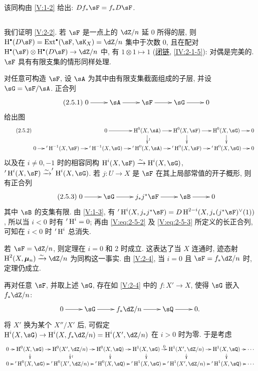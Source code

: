 该同构由 \ref{V:1-2} 给出: $D f_\ast\sF=f_\ast D\sF$.

\subsection{}\label{V:2-5}

我们证明 \ref{V:2-2}. 若 $\sF$ 是一点上的 $\dZ/n$ 延 $0$ 所得的层,
则 $\h^\bullet(D\sF) = \ext^\bullet(\sF,\sK_X)=\dZ/n$ 集中于次数 $0$,
且在配对 $\h^\bullet(\sF)\otimes\h^\bullet(D\sF) \to \dZ/n$ 中,
有 $1\otimes 1\mapsto 1$ (\hyperref[IV]{闭链}, \ref{IV:2-1-5}): 对偶是完美的.
$\sF$ 具有有限支集的情形同样处理.

对任意可构造 $\sF$, 设 $\sA$ 为其中由有限支集截面组成的子层, 并设 $\sG=\sF/\sA$.
正合列
\begin{equation*}\label{V:eq:2-5-1}\tag{2.5.1}
\xymatrix{
  0 \ar[r]
    & \sA \ar[r]
    & \sF \ar[r]
    & \sG \ar[r]
    & 0
}
\end{equation*}
给出图
\begin{equation*}\tag{2.5.2}\label{V:eq:2-5-2}
\xymatrix@R=.5cm@C=.42cm{
  & & 0 \ar[r]
    & \h^0(X,\sA) \ar[r] \ar[d]^-\wr
    & \h^0(X,\sF) \ar[r] \ar[d]
    & \h^0(X,\sG) \ar[r] \ar[d]
    & 0 \\
  0 \ar[r]
  & '\h^{-1}(X,\sF) \ar[r]
  & '\h^{-1}(X,\sG) \ar[r]
  & '\h^0(X,\sA) \ar[r]
  & '\h^0(X,\sF) \ar[r]
  & '\h^0(X,\sG) \ar[r]
  & 0
}
\end{equation*}
以及在 $i\ne 0,-1$ 时的相容同构 $\h^i(X,\sF)\iso \h^i(X,\sG)$,
$'\h^i(X,\sF) \iso '\h^i(X,\sG)$.
若 $j:U\to X$ 是 $\sF$ 在其上局部常值的开子概形, 则有正合列
\begin{equation*}\tag{2.5.3}\label{V:eq:2-5-3}
\xymatrix{
  0 \ar[r]
    & \sG \ar[r]
    & j_\ast j^\ast \sF \ar[r]
    & \sB \ar[r]
    & 0
}
\end{equation*}
其中 $\sB$ 的支集有限.
由 \ref{V:1-3}, 有
$'\h^i(X,j_\ast j^\ast\sF) = D \h^{2-i} (X,j_\ast(j^\ast\sF)^\vee(1))$,
所以当 $i<0$ 时有 $'\operatorname{H}^i=0$;
再由 \eqref{V:eq:2-5-2} 及 \eqref{V:eq:2-5-3} 所定义的长正合列,
可知在 $i<0$ 时 $'\operatorname{H}^i$ 总消失.

若 $\sF=\dZ/n$, 则定理在 $i=0$ 和 $2$ 时成立.
这表达了当 $X$ 连通时, 迹态射 $\h^2(X,\dmu_n) \iso \dZ/n$ 为同构这一事实.
由 \ref{V:2-4}, 当 $i=0$ 且 $\sF=f_\ast\dZ/n$ 时, 定理仍成立.

再对任意 $\sF$, 并取上述 $\sG$, 存在如 \ref{V:2-4} 中的 $f:X'\to X$,
使得 $\sG$ 嵌入 $f_\ast\dZ/n$:
\[\xymatrix{
  0 \ar[r]
    & \sG \ar[r]
    & f_\ast\dZ/n \ar[r]
    & \sQ \ar[r]
    & 0 \text{.}
}\]
将 $X'$ 换为某个 $X''/X'$ 后, 可假定
$\h^i(X,\sG) \to \h^i(X,f_\ast\dZ/n) = \h^i(X',\dZ/n)$ 在 $i>0$ 时为零.
于是考虑
\small
\[\xymatrix@R=.3cm@C=.17cm{
  0 \ar[r]
    & \h^0(X,\sG) \ar[r] \ar[d]
    & \h^0(X',\dZ/n) \ar[r] \ar[d]^-\wr
    & \h^0(X,\sQ) \ar[r] \ar[d]
    & \h^1(X,\sG) \ar[r]^-0 \ar[d]
    & \h^1(X',\dZ/n) \ar[r] \ar[d]
    & \h^1(X,\sQ) \ar[r] \ar[d]
    & \cdots \\
  0 \ar[r]
    & '\h^0(X,\sG) \ar[r]
    & '\h^0(X',\dZ/n) \ar[r]
    & '\h^0(X,\sQ) \ar[r]
    & '\h^1(X,\sG) \ar[r]
    & '\h^1(X',\dZ/n) \ar[r]
    & '\h^1(X,\sQ) \ar[r]
    & \cdots
}\]
\normalsize


